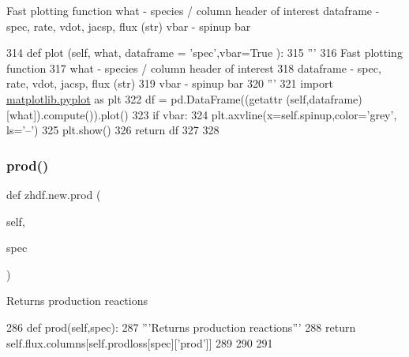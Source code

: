 \begin{DoxyVerb}Fast plotting function
what - species / column header of interest
dataframe - spec, rate, vdot, jacsp, flux (str)
vbar - spinup bar
\end{DoxyVerb}
 
\begin{DoxyCode}
314     \textcolor{keyword}{def }plot (self, what, dataframe = 'spec',vbar=True ):
315         \textcolor{stringliteral}{'''}
316 \textcolor{stringliteral}{        Fast plotting function}
317 \textcolor{stringliteral}{        what - species / column header of interest}
318 \textcolor{stringliteral}{        dataframe - spec, rate, vdot, jacsp, flux (str)}
319 \textcolor{stringliteral}{        vbar - spinup bar}
320 \textcolor{stringliteral}{        '''}
321         \textcolor{keyword}{import} \mbox{\hyperlink{namespacematplotlib_1_1pyplot}{matplotlib.pyplot}} \textcolor{keyword}{as} plt
322         df = pd.DataFrame((getattr (self,dataframe)[what]).compute()).plot()
323         \textcolor{keywordflow}{if} vbar:
324             plt.axvline(x=self.spinup,color=\textcolor{stringliteral}{'grey'}, ls=\textcolor{stringliteral}{'--'})
325         plt.show()
326         \textcolor{keywordflow}{return} df
327 
328 
\end{DoxyCode}
\mbox{\label{classzhdf_1_1new_a7e698f744d38ec1a6a308a21fafa63e5}} 
\subsubsection{\texorpdfstring{prod()}{prod()}\hspace{0.1cm}{\footnotesize\ttfamily [1/2]}}
{\footnotesize\ttfamily def zhdf.\+new.\+prod (\begin{DoxyParamCaption}\item[{}]{self,  }\item[{}]{spec }\end{DoxyParamCaption})}

\begin{DoxyVerb}Returns production reactions\end{DoxyVerb}
 
\begin{DoxyCode}
286     \textcolor{keyword}{def }prod(self,spec):
287         \textcolor{stringliteral}{'''Returns production reactions'''}
288         \textcolor{keywordflow}{return} self.flux.columns[self.prodloss[spec][\textcolor{stringliteral}{'prod'}]]
289 
290 
291 
\end{DoxyCode}
\mbox{\label{classzhdf_1_1new_a7e698f744d38ec1a6a308a21fafa63e5}} 
